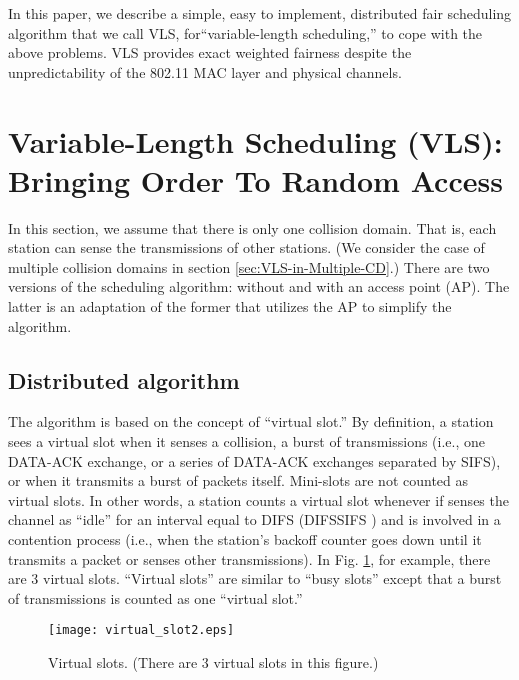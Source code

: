 \documentclass[letterpaper, 10 pt, conference]{ieeeconf}
\begin{document}
In this paper, we describe a simple, easy to implement, distributed fair scheduling algorithm that we call
VLS, for``variable-length scheduling,'' to cope with the above problems.
VLS provides exact weighted fairness despite the unpredictability of the 802.11
MAC layer and physical channels.


\section{Variable-Length Scheduling (VLS): Bringing Order To Random Access}

In this section, we assume that there is only one collision domain. That is, each
station can sense the transmissions of other stations. (We consider
the case of multiple collision domains in section \ref{sec:VLS-in-Multiple-CD}.)
There are two versions of the scheduling algorithm: without and with an access point (AP). 
The latter is
an adaptation of the former that utilizes the  AP to simplify the algorithm.


\subsection{\label{sub:Distributed-algorithm}Distributed algorithm}

The algorithm is based on the concept of {}``virtual slot.'' By definition, a station
sees a virtual slot when it senses a collision, a burst of transmissions
(i.e., one DATA-ACK exchange, or a series of DATA-ACK exchanges separated
by SIFS), or when it transmits a burst of packets itself. Mini-slots
are not counted as virtual slots. In other words, a station counts a virtual slot whenever
if senses the channel as {}``idle'' for an interval equal to DIFS (DIFSSIFS \cite{80211}) and is involved in a contention
process (i.e., when the station's backoff counter goes down until it transmits a
packet or senses other transmissions). In Fig. \ref{fig:Virtual-slots}, for example, there are
3 virtual slots. {}``Virtual slots'' are similar to {}``busy slots''
except that a burst of transmissions is counted as one {}``virtual
slot.''

\begin{figure}
\noindent \begin{centering}
\texttt{[image: virtual\_slot2.eps]}
\end{centering}
\caption{\label{fig:Virtual-slots}Virtual slots. (There are 3 virtual slots
in this figure.)}
\end{figure}
\end{document}

